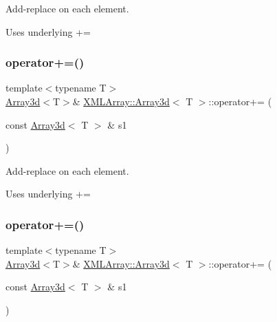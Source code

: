 Add-\/replace on each element. 

Uses underlying += \mbox{\label{classXMLArray_1_1Array3d_add116e7a7b9da853f2b463d5fb3a9b1e}} 
\subsubsection{\texorpdfstring{operator+=()}{operator+=()}\hspace{0.1cm}{\footnotesize\ttfamily [2/3]}}
{\footnotesize\ttfamily template$<$typename T$>$ \\
\mbox{\hyperlink{classXMLArray_1_1Array3d}{Array3d}}$<$T$>$\& \mbox{\hyperlink{classXMLArray_1_1Array3d}{X\+M\+L\+Array\+::\+Array3d}}$<$ T $>$\+::operator+= (\begin{DoxyParamCaption}\item[{const \mbox{\hyperlink{classXMLArray_1_1Array3d}{Array3d}}$<$ T $>$ \&}]{s1 }\end{DoxyParamCaption})\hspace{0.3cm}{\ttfamily [inline]}}



Add-\/replace on each element. 

Uses underlying += \mbox{\label{classXMLArray_1_1Array3d_add116e7a7b9da853f2b463d5fb3a9b1e}} 
\subsubsection{\texorpdfstring{operator+=()}{operator+=()}\hspace{0.1cm}{\footnotesize\ttfamily [3/3]}}
{\footnotesize\ttfamily template$<$typename T$>$ \\
\mbox{\hyperlink{classXMLArray_1_1Array3d}{Array3d}}$<$T$>$\& \mbox{\hyperlink{classXMLArray_1_1Array3d}{X\+M\+L\+Array\+::\+Array3d}}$<$ T $>$\+::operator+= (\begin{DoxyParamCaption}\item[{const \mbox{\hyperlink{classXMLArray_1_1Array3d}{Array3d}}$<$ T $>$ \&}]{s1 }\end{DoxyParamCaption})\hspace{0.3cm}{\ttfamily [inline]}}



